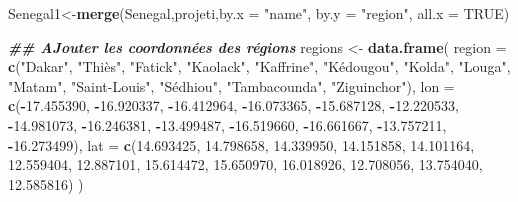 \documentclass[
]{article}
\newenvironment{Shaded}{\begin{snugshade}}{\end{snugshade}}
\newcommand{\AttributeTok}[1]{\textcolor[rgb]{0.13,0.29,0.53}{#1}}
\newcommand{\ConstantTok}[1]{\textcolor[rgb]{0.56,0.35,0.01}{#1}}
\newcommand{\DocumentationTok}[1]{\textcolor[rgb]{0.56,0.35,0.01}{\textbf{\textit{#1}}}}
\newcommand{\FloatTok}[1]{\textcolor[rgb]{0.00,0.00,0.81}{#1}}
\newcommand{\FunctionTok}[1]{\textcolor[rgb]{0.13,0.29,0.53}{\textbf{#1}}}
\newcommand{\NormalTok}[1]{#1}
\newcommand{\OtherTok}[1]{\textcolor[rgb]{0.56,0.35,0.01}{#1}}
\newcommand{\SpecialCharTok}[1]{\textcolor[rgb]{0.81,0.36,0.00}{\textbf{#1}}}
\newcommand{\StringTok}[1]{\textcolor[rgb]{0.31,0.60,0.02}{#1}}
\begin{document}
\begin{Shaded}
\begin{Highlighting}[]
\NormalTok{Senegal1}\OtherTok{\textless{}{-}}\FunctionTok{merge}\NormalTok{(Senegal,projeti,}\AttributeTok{by.x =} \StringTok{"name"}\NormalTok{, }\AttributeTok{by.y =} \StringTok{"region"}\NormalTok{, }\AttributeTok{all.x =} \ConstantTok{TRUE}\NormalTok{)}

\DocumentationTok{\#\# AJouter les coordonnées des régions}
\NormalTok{regions }\OtherTok{\textless{}{-}} \FunctionTok{data.frame}\NormalTok{(}
  \AttributeTok{region =} \FunctionTok{c}\NormalTok{(}\StringTok{"Dakar"}\NormalTok{, }\StringTok{"Thiès"}\NormalTok{, }\StringTok{"Fatick"}\NormalTok{, }\StringTok{"Kaolack"}\NormalTok{, }\StringTok{"Kaffrine"}\NormalTok{, }\StringTok{"Kédougou"}\NormalTok{, }\StringTok{"Kolda"}\NormalTok{, }\StringTok{"Louga"}\NormalTok{, }\StringTok{"Matam"}\NormalTok{, }\StringTok{"Saint{-}Louis"}\NormalTok{, }\StringTok{"Sédhiou"}\NormalTok{, }\StringTok{"Tambacounda"}\NormalTok{, }\StringTok{"Ziguinchor"}\NormalTok{),}
  \AttributeTok{lon =} \FunctionTok{c}\NormalTok{(}\SpecialCharTok{{-}}\FloatTok{17.455390}\NormalTok{, }\SpecialCharTok{{-}}\FloatTok{16.920337}\NormalTok{, }\SpecialCharTok{{-}}\FloatTok{16.412964}\NormalTok{, }\SpecialCharTok{{-}}\FloatTok{16.073365}\NormalTok{, }\SpecialCharTok{{-}}\FloatTok{15.687128}\NormalTok{, }\SpecialCharTok{{-}}\FloatTok{12.220533}\NormalTok{, }\SpecialCharTok{{-}}\FloatTok{14.981073}\NormalTok{, }\SpecialCharTok{{-}}\FloatTok{16.246381}\NormalTok{, }\SpecialCharTok{{-}}\FloatTok{13.499487}\NormalTok{, }\SpecialCharTok{{-}}\FloatTok{16.519660}\NormalTok{, }\SpecialCharTok{{-}}\FloatTok{16.661667}\NormalTok{, }\SpecialCharTok{{-}}\FloatTok{13.757211}\NormalTok{, }\SpecialCharTok{{-}}\FloatTok{16.273499}\NormalTok{),}
  \AttributeTok{lat =} \FunctionTok{c}\NormalTok{(}\FloatTok{14.693425}\NormalTok{, }\FloatTok{14.798658}\NormalTok{, }\FloatTok{14.339950}\NormalTok{, }\FloatTok{14.151858}\NormalTok{, }\FloatTok{14.101164}\NormalTok{, }\FloatTok{12.559404}\NormalTok{, }\FloatTok{12.887101}\NormalTok{, }\FloatTok{15.614472}\NormalTok{, }\FloatTok{15.650970}\NormalTok{, }\FloatTok{16.018926}\NormalTok{, }\FloatTok{12.708056}\NormalTok{, }\FloatTok{13.754040}\NormalTok{, }\FloatTok{12.585816}\NormalTok{)}
\NormalTok{)}


\end{Highlighting}
\end{Shaded}
\end{document}
